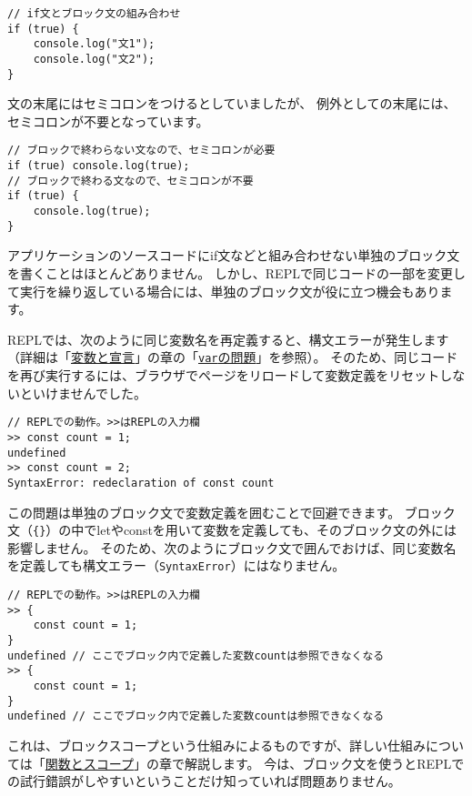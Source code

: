 \begin{lstlisting}
// if文とブロック文の組み合わせ
if (true) {
    console.log("文1");
    console.log("文2");
}
\end{lstlisting}

文の末尾にはセミコロンをつけるとしていましたが、
例外として\textbf{}の末尾には、セミコロンが不要となっています。

\begin{lstlisting}
// ブロックで終わらない文なので、セミコロンが必要
if (true) console.log(true);
// ブロックで終わる文なので、セミコロンが不要
if (true) {
    console.log(true);
}
\end{lstlisting}

\begin{tcolorbox}[floatplacement=t,float,title=単独のブロック文の活用]\label{isolate-block-statement}

アプリケーションのソースコードにif文などと組み合わせない単独のブロック文を書くことはほとんどありません。
しかし、REPLで同じコードの一部を変更して実行を繰り返している場合には、単独のブロック文が役に立つ機会もあります。

REPLでは、次のように同じ変数名を再定義すると、構文エラーが発生します（詳細は「\hyperlink{variable-and-declaration}{変数と宣言}」の章の「\hyperlink{var-issues}{\texttt{var}の問題}」を参照）。
そのため、同じコードを再び実行するには、ブラウザでページをリロードして変数定義をリセットしないといけませんでした。

\begin{lstlisting}
// REPLでの動作。>>はREPLの入力欄
>> const count = 1;
undefined
>> const count = 2;
SyntaxError: redeclaration of const count
\end{lstlisting}

この問題は単独のブロック文で変数定義を囲むことで回避できます。
ブロック文（\texttt{\{\}}）の中でletやconstを用いて変数を定義しても、そのブロック文の外には影響しません。
そのため、次のようにブロック文で囲んでおけば、同じ変数名を定義しても構文エラー（\texttt{SyntaxError}）にはなりません。

\begin{lstlisting}
// REPLでの動作。>>はREPLの入力欄
>> {
    const count = 1;
}
undefined // ここでブロック内で定義した変数countは参照できなくなる
>> {
    const count = 1;
}
undefined // ここでブロック内で定義した変数countは参照できなくなる
\end{lstlisting}

これは、ブロックスコープという仕組みによるものですが、詳しい仕組みについては「\hyperlink{function-and-scope}{関数とスコープ}」の章で解説します。
今は、ブロック文を使うとREPLでの試行錯誤がしやすいということだけ知っていれば問題ありません。
\end{tcolorbox}

